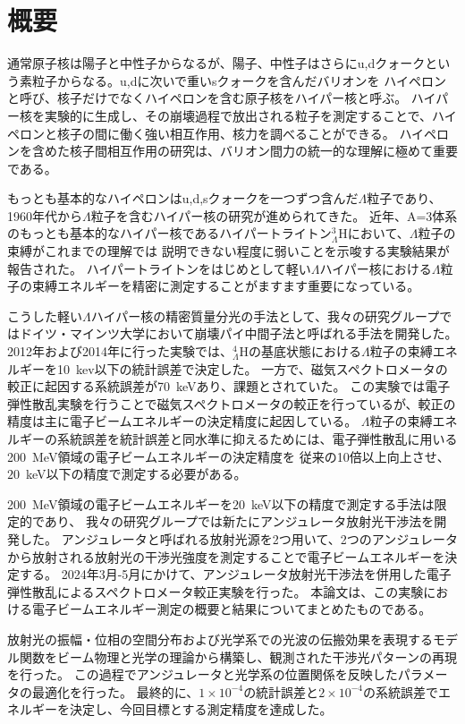\documentclass[a4paper,11pt,uplatex]{jsbook}
\begin{document}
\chapter*{概要}
通常原子核は陽子と中性子からなるが、陽子、中性子はさらにu,dクォークという素粒子からなる。u,dに次いで重いsクォークを含んだバリオンを
ハイペロンと呼び、核子だけでなくハイペロンを含む原子核をハイパー核と呼ぶ。
ハイパー核を実験的に生成し、その崩壊過程で放出される粒子を測定することで、ハイペロンと核子の間に働く強い相互作用、核力を調べることができる。
ハイペロンを含めた核子間相互作用の研究は、バリオン間力の統一的な理解に極めて重要である。

もっとも基本的なハイペロンはu,d,sクォークを一つずつ含んだ$\Lambda$粒子であり、1960年代から$\Lambda$粒子を含むハイパー核の研究が進められてきた。
近年、A=3体系のもっとも基本的なハイパー核であるハイパートライトン$_{\Lambda}^3\text{H}$において、$\Lambda$粒子の束縛がこれまでの理解では
説明できない程度に弱いことを示唆する実験結果が報告された。
ハイパートライトンをはじめとして軽い$\Lambda$ハイパー核における$\Lambda$粒子の束縛エネルギーを精密に測定することがますます重要になっている。

こうした軽い$\Lambda$ハイパー核の精密質量分光の手法として、我々の研究グループではドイツ・マインツ大学において崩壊パイ中間子法と呼ばれる手法を開発した。
2012年および2014年に行った実験では、$_{\Lambda}^4\text{H}$の基底状態における$\Lambda$粒子の束縛エネルギーを10~kev以下の統計誤差で決定した。
一方で、磁気スペクトロメータの較正に起因する系統誤差が70~keVあり、課題とされていた。
この実験では電子弾性散乱実験を行うことで磁気スペクトロメータの較正を行っているが、較正の精度は主に電子ビームエネルギーの決定精度に起因している。
$\Lambda$粒子の束縛エネルギーの系統誤差を統計誤差と同水準に抑えるためには、電子弾性散乱に用いる200~MeV領域の電子ビームエネルギーの決定精度を
従来の10倍以上向上させ、$20$~keV以下の精度で測定する必要がある。

200~MeV領域の電子ビームエネルギーを$20$~keV以下の精度で測定する手法は限定的であり、
我々の研究グループでは新たにアンジュレータ放射光干渉法を開発した。
アンジュレータと呼ばれる放射光源を2つ用いて、2つのアンジュレータから放射される放射光の干渉光強度を測定することで電子ビームエネルギーを決定する。
2024年3月-5月にかけて、アンジュレータ放射光干渉法を併用した電子弾性散乱によるスペクトロメータ較正実験を行った。
本論文は、この実験における電子ビームエネルギー測定の概要と結果についてまとめたものである。

放射光の振幅・位相の空間分布および光学系での光波の伝搬効果を表現するモデル関数をビーム物理と光学の理論から構築し、観測された干渉光パターンの再現を行った。
この過程でアンジュレータと光学系の位置関係を反映したパラメータの最適化を行った。
最終的に、$1\times10^{-4}$の統計誤差と$2\times10^{-4}$の系統誤差でエネルギーを決定し、今回目標とする測定精度を達成した。
\end{document}
